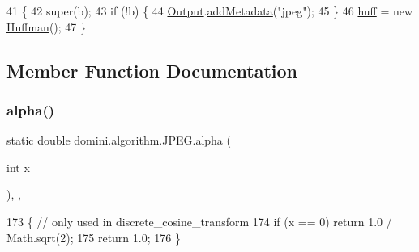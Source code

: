 \begin{DoxyCode}
41                            \{
42         super(b);
43         \textcolor{keywordflow}{if} (!b) \{
44             \hyperlink{classdomini_1_1algorithm_1_1Algorithm_a4de9955411c656325adc391ef570c082}{Output}.\hyperlink{classpersistencia_1_1output_1_1Ctrl__Output_ae6d6857910a023982900ddc857b891f0}{addMetadata}(\textcolor{stringliteral}{"jpeg"});
45         \}
46         \hyperlink{classdomini_1_1algorithm_1_1JPEG_aacc6445baa7819e3f9139ffb78e0b8f4}{huff} = \textcolor{keyword}{new} \hyperlink{classHuffman}{Huffman}();
47     \}
\end{DoxyCode}


\subsection{Member Function Documentation}
\mbox{\label{classdomini_1_1algorithm_1_1JPEG_a058b0ee7eb44bbaec4078b5fc32c5107}} 
\subsubsection{\texorpdfstring{alpha()}{alpha()}}
{\footnotesize\ttfamily static double domini.\+algorithm.\+J\+P\+E\+G.\+alpha (\begin{DoxyParamCaption}\item[{int}]{x }\end{DoxyParamCaption})\hspace{0.3cm}{\ttfamily [inline]}, {\ttfamily [static]}, {\ttfamily [private]}}


\begin{DoxyCode}
173                                        \{ \textcolor{comment}{// only used in discrete\_cosine\_transform}
174         \textcolor{keywordflow}{if} (x == 0) \textcolor{keywordflow}{return} 1.0 / Math.sqrt(2);
175         \textcolor{keywordflow}{return} 1.0;
176     \}
\end{DoxyCode}
\mbox{\label{classdomini_1_1algorithm_1_1JPEG_a753bf49f2c8bde9e54464b21a1bcb2d8}} 

